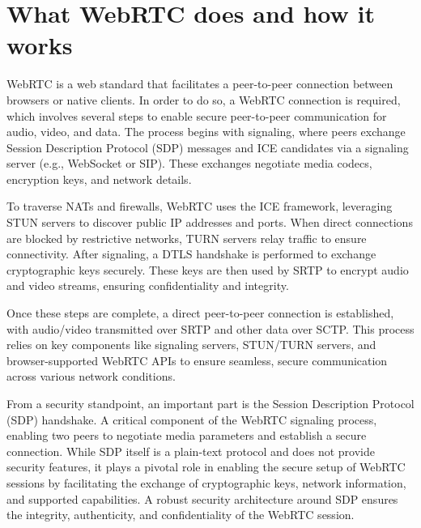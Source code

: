 \documentclass[conference]{IEEEtran}
\begin{document}
\section{What WebRTC does and how it works}
WebRTC is a web standard that facilitates a peer-to-peer connection between browsers or native clients. In order to do so, a WebRTC connection 
is required, which involves several steps to enable secure peer-to-peer communication for audio, video, and data. 
The process begins with signaling, where peers exchange Session Description Protocol (SDP) messages and ICE candidates via a 
signaling server (e.g., WebSocket or SIP). These exchanges negotiate media codecs, encryption keys, and network details. \cite{W3C_WebRTC}

To traverse NATs and firewalls, WebRTC uses the ICE framework, leveraging STUN servers to discover public IP addresses and ports. 
When direct connections are blocked by restrictive networks, TURN servers relay traffic to ensure connectivity. After signaling, a
DTLS handshake is performed to exchange cryptographic keys securely. These keys are then used by SRTP to encrypt audio and video streams, 
ensuring confidentiality and integrity. \cite{W3C_WebRTC}

Once these steps are complete, a direct peer-to-peer connection is established, with audio/video transmitted over SRTP 
and other data over SCTP. This process relies on key components like signaling servers, STUN/TURN servers, and browser-supported 
WebRTC APIs to ensure seamless, secure communication across various network conditions. \cite{W3C_WebRTC}

From a security standpoint, an important part is the Session Description Protocol (SDP) handshake. A critical component of the WebRTC signaling process, 
enabling two peers to negotiate media parameters and establish a secure connection.\cite{RFC8827} While SDP itself is a plain-text protocol 
and does not provide security features, it plays a pivotal role in enabling the secure setup of WebRTC sessions by facilitating the exchange 
of cryptographic keys, network information, and supported capabilities. A robust security architecture around SDP ensures the integrity, 
authenticity, and confidentiality of the WebRTC session.
\end{document}
